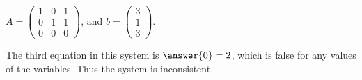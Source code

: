 \documentclass{ximera}
\begin{document}
\begin{exercise}
\item $A = \begin{pmatrix}1 & 0 & 1\\ 0 & 1 & 1 \\ 0 & 0 & 0\end{pmatrix}$, 
and $b = \begin{pmatrix}3 \\ 1 \\ 3\end{pmatrix}$. 

\begin{multipleChoice}
\end{multipleChoice}

\begin{problem}
The third equation in this system is $\answer{0} = 2$, which is false for any values of the variables.  Thus the system is inconsistent.  
\end{problem}
\end{exercise}
\end{document}

